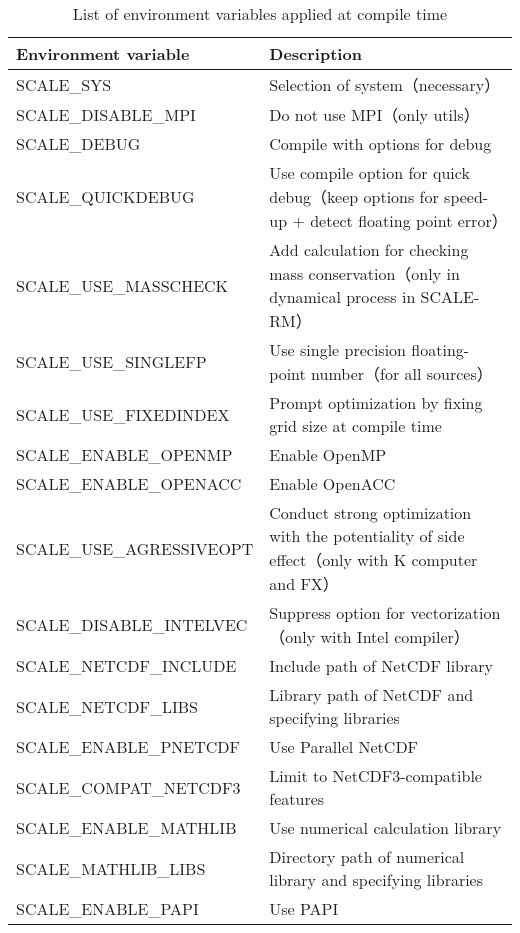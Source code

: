 \begin{table}[htb]
\begin{center}
\caption{List of environment variables applied at compile time}
\begin{tabularx}{150mm}{|l|X|} \hline
 \rowcolor[gray]{0.9} Environment variable & Description  \\ \hline
 SCALE\_SYS               & Selection of system（necessary）  \\ \hline
 SCALE\_DISABLE\_MPI      & Do not use MPI（only utils）  \\ \hline
 SCALE\_DEBUG             & Compile with options for debug  \\ \hline
 SCALE\_QUICKDEBUG        & Use compile option for quick debug（keep options for speed-up + detect floating point error）  \\ \hline
 SCALE\_USE\_MASSCHECK    & Add calculation for checking mass conservation（only in dynamical process in SCALE-RM）  \\ \hline
 SCALE\_USE\_SINGLEFP     & Use single precision floating-point number（for all sources）  \\ \hline
 SCALE\_USE\_FIXEDINDEX   & Prompt optimization by fixing grid size at compile time  \\ \hline
 SCALE\_ENABLE\_OPENMP    & Enable OpenMP  \\ \hline
 SCALE\_ENABLE\_OPENACC   & Enable OpenACC  \\ \hline
 SCALE\_USE\_AGRESSIVEOPT & Conduct strong optimization with the potentiality of side effect（only with K computer and FX）  \\ \hline
 SCALE\_DISABLE\_INTELVEC & Suppress option for vectorization（only with Intel compiler）  \\ \hline
 SCALE\_NETCDF\_INCLUDE   & Include path of NetCDF library  \\ \hline
 SCALE\_NETCDF\_LIBS      & Library path of NetCDF and specifying libraries  \\ \hline
 SCALE\_ENABLE\_PNETCDF   & Use Parallel NetCDF  \\ \hline
 SCALE\_COMPAT\_NETCDF3   & Limit to NetCDF3-compatible features  \\ \hline
 SCALE\_ENABLE\_MATHLIB   & Use numerical calculation library  \\ \hline
 SCALE\_MATHLIB\_LIBS     & Directory path of numerical library and specifying libraries  \\ \hline
 SCALE\_ENABLE\_PAPI      & Use PAPI  \\ \hline

\end{tabularx}
\end{center}
\end{table}
